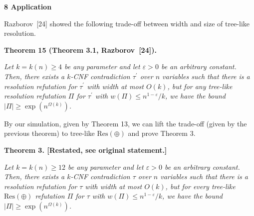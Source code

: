 \par\medskip\noindent\textbf{
8 Application}\par




Razborov [24] showed the following trade-off between width and size of tree-like resolution.\par





\par\medskip\noindent\textbf{
\textbf{Theorem 15}\textbf{ }(Theorem 3.1, Razborov [24])\textbf{.}
}\par



\emph{Let $k=k(n)\geq 4$ be any parameter and let $\varepsilon>0$ be an arbitrary constant.
Then, there exists a $k$-CNF contradiction $\tau^{\prime}$ over $n$ variables such that there is a resolution refutation for $\tau^{\prime}$ with width at most $O(k)$, but for any tree-like resolution refutation $\Pi$ for $\tau^{\prime}$ with $w(\Pi)\leq n^{1-\varepsilon}/k$, we have the bound $|\Pi|\geq\exp(n^{\Omega(k)})$.}\par






By our simulation, given by Theorem 13, we can lift the trade-off (given by the previous theorem) to tree-like $\text{Res}(\oplus)$ and prove Theorem 3.\par






\par\medskip\noindent\textbf{
\textbf{Theorem 3}\textbf{.}
[Restated, see original statement.]}\par



\emph{Let $k=k(n)\geq 12$ be any parameter and let $\varepsilon>0$ be an arbitrary constant.
Then, there exists a $k$-CNF contradiction $\tau$ over $n$ variables such that there is a resolution refutation for $\tau$ with width at most $O(k)$, but for every tree-like $\text{Res}(\oplus)$ refutation $\Pi$ for $\tau$ with $w(\Pi)\leq n^{1-\varepsilon}/k$, we have the bound $|\Pi|\geq\exp(n^{\Omega(k)})$.}\par







